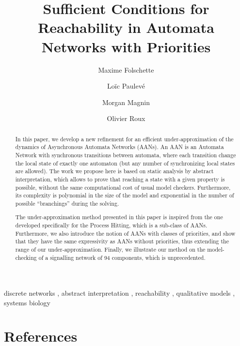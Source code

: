 \documentclass{elsarticle}
\begin{document}
\begin{frontmatter}
\title{Sufficient Conditions for Reachability in Automata Networks with Priorities}

\author[irccyn]{Maxime Folschette}
\author[lri,amib]{Loïc Paulevé}
\author[irccyn]{Morgan Magnin}
\author[irccyn]{Olivier Roux}

\address[irccyn]{LUNAM Universit\'e, \'Ecole Centrale de Nantes, IRCCyN UMR CNRS 6597\\
(Institut de Recherche en Communications et Cybern\'etique de Nantes)\\
1 rue de la No\"e - B.P. 92101 - 44321 Nantes Cedex 3, France.}

\address[lri]{CNRS, Laboratoire de Recherche en Informatique (LRI)\\
		Université Paris-Sud - CNRS UMR 8623, France}
\address[amib]{AMIB group, Inria Saclay, France}{}



\begin{abstract}
In this paper,
we develop a new refinement for an efficient under-approximation of the dynamics of
Asynchronous Automata Networks (AANs).
An AAN is an Automata Network with synchronous transitions between automata,
where each transition change the local state of exactly one automaton
(but any number of synchronizing local states are allowed).
The work we propose here
is based on static analysis by abstract interpretation,
which allows to prove that reaching a state with a given property
is possible,
without the same computational cost of usual model checkers.
Furthermore, its complexity is polynomial in the size of the model
and exponential in the number of possible “branchings” during the solving.

The under-approximation method presented in this paper is inspired
from the one developed specifically for the Process Hitting,
which is a sub-class of AANs.
Furthermore, we also introduce the notion of AANs with classes of priorities,
and show that they have the same expressivity as AANs without priorities,
thus extending the range of our under-approximation.
Finally, we illustrate our method on the model-checking of a signalling network
of 94 components, which is unprecedented.
\end{abstract}
\begin{keyword}
discrete networks \sep
abstract interpretation \sep
reachability \sep
qualitative models \sep
systems biology
\end{keyword}
\end{frontmatter}















\section*{References}




\end{document}
